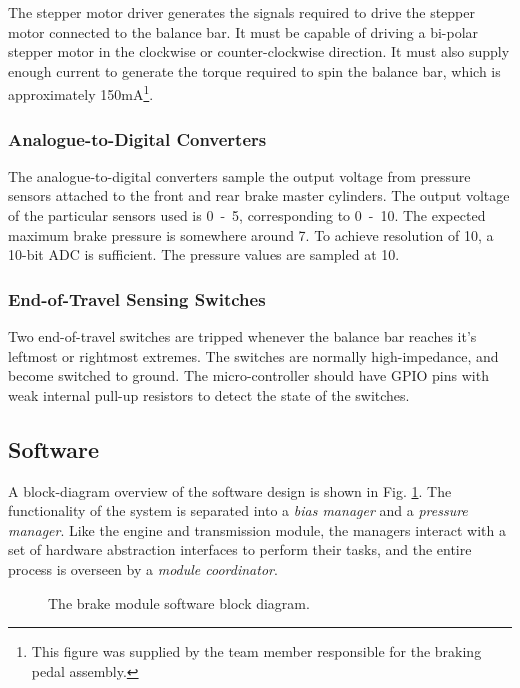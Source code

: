 The stepper motor driver generates the signals required to drive the stepper motor connected to the balance bar. It must be capable of  driving a bi-polar stepper motor in the clockwise or counter-clockwise direction. It must also supply enough current to generate the torque required to spin the balance bar, which is approximately \unit{150}{mA}\footnote{This figure was supplied by the team member responsible for the braking pedal assembly.}.

\subsubsection{Analogue-to-Digital Converters}

The analogue-to-digital converters sample the output voltage from pressure sensors attached to the front and rear brake master cylinders. The output voltage of the particular sensors used is \unit{0-5}{\volt}, corresponding to \unit{0-10}{\mega\pascal}. The expected maximum brake pressure is somewhere around \unit{7}{\mega\pascal}. To achieve resolution of \unit{10}{\kilo\pascal}, a 10-bit ADC is sufficient. The pressure values are sampled at \unit{10}{\hertz}.

\subsubsection{End-of-Travel Sensing Switches}

Two end-of-travel switches are tripped whenever the balance bar reaches it's leftmost or rightmost extremes. The switches are normally high-impedance, and become switched to ground. The micro-controller should have GPIO pins with weak internal pull-up resistors to detect the state of the switches.

\subsection{Software}

A block-diagram overview of the software design is shown in Fig. \ref{fig:brake_software_design_block}. The functionality of the system is separated into a \emph{bias manager} and a \emph{pressure manager}. Like the engine and transmission module, the managers interact with a set of hardware abstraction interfaces to perform their tasks, and the entire process is overseen by a \emph{module coordinator}.

\begin{figure}[H]
	\centering
	
	\caption{The brake module software block diagram.}
	\label{fig:brake_software_design_block}
\end{figure}

